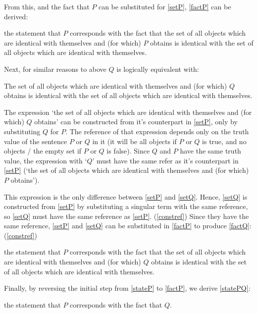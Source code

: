 From this, and the fact that $P$ can be substituted for \ref{setP}, \ref{factP} can be derived:

	\begin{example}\label{factP}
	the statement that $P$ corresponds with the fact that the set of all objects which are identical with themselves and (for which) $P$ obtains is identical with the set of all objects which are identical with themselves.
	\end{example}

Next, for similar reasons to above $Q$ is logically equivalent with:

	\begin{example}\label{setQ}
	The set of all objects which are identical with themselves and (for which) $Q$ obtains is identical with the set of all objects which are identical with themselves.
	\end{example}

The expression `the set of all objects which are identical with themselves and (for which) $Q$ obtains' can be constructed from it's counterpart in \ref{setP}, only by substituting $Q$ for $P$.
The reference of that expression depends only on the truth value of the sentence $P$ or $Q$ in it (it will be all objects if $P$ or $Q$ is true, and no objects / the empty set if $P$ or $Q$ is false).
Since $Q$ and $P$ have the same truth value, the expression with `$Q$' must have the same refer as it's counterpart in \ref{setP} (`the set of all objects which are identical with themselves and (for which) $P$ obtains').

This expression is the only difference between \ref{setP} and \ref{setQ}.
Hence, \ref{setQ} is constructed from \ref{setP} by substituting a singular term with the same reference, so \ref{setQ} must have the same reference as \ref{setP}.
(\ref{constref})
Since they have the same reference, \ref{setP} and \ref{setQ} can be substituted in \ref{factP} to produce \ref{factQ}:
(\ref{constref}) 

	\begin{example}\label{factQ}
	the statement that $P$ corresponds with the fact that the set of all objects which are identical with themselves and (for which) $Q$ obtains is identical with the set of all objects which are identical with themselves.
	\end{example}

Finally, by reversing the initial step from \ref{stateP} to \ref{factP}, we derive \ref{statePQ}:

	\begin{example}\label{statePQ}
	the statement that $P$ corresponds with the fact that $Q$.
	\end{example}

